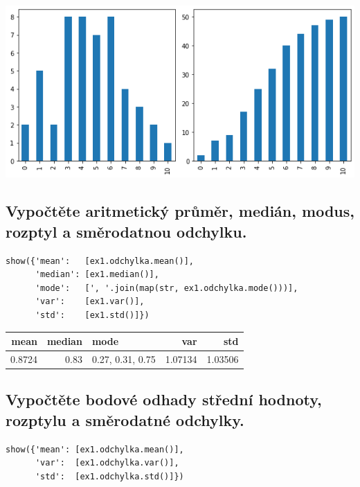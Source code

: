 \documentclass[11pt,titlepage]{article}
\begin{document}
\begin{center}
\includegraphics[width=.9\linewidth]{./obipy-resources/qPqHVY.png}
\end{center}

\subsection{Vypočtěte aritmetický průměr, medián, modus, rozptyl a směrodatnou odchylku.}
\label{sec:orgac4b344}
\begin{listing}[htbp]
\begin{verbatim}
show({'mean':   [ex1.odchylka.mean()],
      'median': [ex1.median()],
      'mode':   [', '.join(map(str, ex1.odchylka.mode()))],
      'var':    [ex1.var()],
      'std':    [ex1.std()]})
\end{verbatim}
\end{listing}

\begin{center}
\begin{tabular}{rrlrr}
mean & median & mode & var & std\\
\hline
0.8724 & 0.83 & 0.27, 0.31, 0.75 & 1.07134 & 1.03506\\
\end{tabular}
\end{center}

\subsection{Vypočtěte bodové odhady střední hodnoty, rozptylu a směrodatné odchylky.}
\label{sec:org397e7d4}

\begin{listing}[htbp]
\begin{verbatim}
show({'mean': [ex1.odchylka.mean()],
      'var':  [ex1.odchylka.var()],
      'std':  [ex1.odchylka.std()]})
\end{verbatim}
\end{listing}
\end{document}
